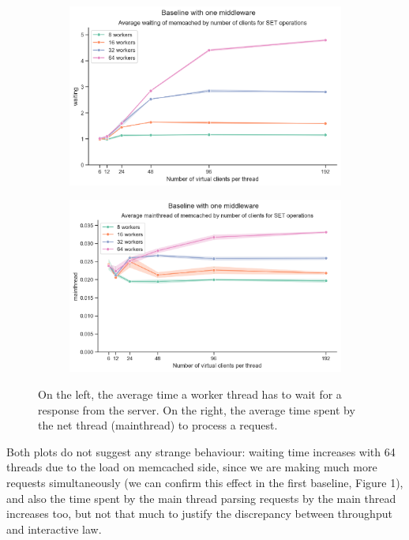 \documentclass[11pt,a4paper]{article}
\begin{document}
\begin{figure}[H]
	\begin{subfigure}[b]{0.5\linewidth}
		\includegraphics[width=\linewidth]{images/middleware_1/last_graph_set_waiting.pdf}
	\end{subfigure}
	\begin{subfigure}[b]{0.5\linewidth}
		\includegraphics[width=\linewidth]{images/middleware_1/last_graph_set_mainthread.pdf}
	\end{subfigure}
	\caption{On the left, the average time a worker thread has to wait for a response from the server. On the right, 
	the average time spent by the net thread (mainthread) to process a request.}
	\label{fig:boat1}
\end{figure}

Both plots do not suggest any strange behaviour: waiting time increases with 64 threads due to the load on memcached side, 
since we are making much more requests simultaneously (we can confirm this effect in the first baseline, Figure 1), and also
the time spent by the main thread parsing requests by the main thread increases too, but not that much to justify the 
discrepancy between throughput and interactive law.
\end{document}
